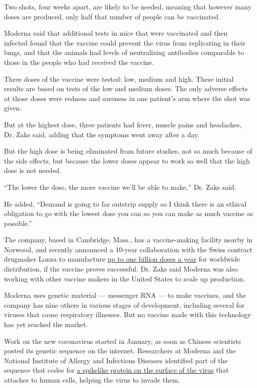 Two shots, four weeks apart, are likely to be needed, meaning that
however many doses are produced, only half that number of people can be
vaccinated.

Moderna said that additional tests in mice that were vaccinated and then
infected found that the vaccine could prevent the virus from replicating
in their lungs, and that the animals had levels of neutralizing
antibodies comparable to those in the people who had received the
vaccine.

Three doses of the vaccine were tested: low, medium and high. These
initial results are based on tests of the low and medium doses. The only
adverse effects at those doses were redness and soreness in one
patient's arm where the shot was given.

But at the highest dose, three patients had fever, muscle pains and
headaches, Dr. Zaks said, adding that the symptoms went away after a
day.

But the high dose is being eliminated from future studies, not so much
because of the side effects, but because the lower doses appear to work
so well that the high dose is not needed.

``The lower the dose, the more vaccine we'll be able to make,'' Dr. Zaks
said.

He added, ``Demand is going to far outstrip supply so I think there is
an ethical obligation to go with the lowest dose you can so you can make
as much vaccine as possible.''

The company, based in Cambridge, Mass., has a vaccine-making facility
nearby in Norwood, and recently announced a 10-year collaboration with
the Swiss contract drugmaker Lonza to manufacture
\href{https://www.cnbc.com/2020/05/01/moderna-and-switzerlands-lonza-strike-a-deal-on-a-potential-coronavirus-vaccine.html}{up
to one billion doses a year} for worldwide distribution, if the vaccine
proves successful. Dr. Zaks said Moderna was also working with other
vaccine makers in the United States to scale up production.

Moderna uses genetic material --- messenger RNA --- to make vaccines,
and the company has nine others in various stages of development,
including several for viruses that cause respiratory illnesses. But no
vaccine made with this technology has yet reached the market.

Work on the new coronavirus started in January, as soon as Chinese
scientists posted its genetic sequence on the internet. Researchers at
Moderna and the National Institute of Allergy and Infectious Diseases
identified part of the sequence that codes for
\href{https://www.nytimes3xbfgragh.onion/interactive/2020/03/11/science/how-coronavirus-hijacks-your-cells.html}{a
spikelike protein on the surface of the virus} that attaches to human
cells, helping the virus to invade them.

